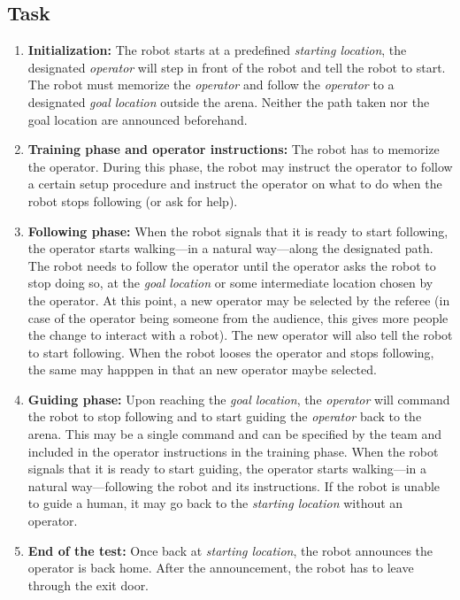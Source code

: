 \subsection{Task}

\begin{enumerate}
\item \textbf{Initialization:} The robot starts at a predefined \emph{starting location}, the designated \textit{operator} will step in front of the robot and tell the robot to start. 
  The robot must memorize the \textit{operator} and follow the \emph{operator} to a designated \emph{goal location} outside the arena. 
  Neither the path taken nor the goal location are announced beforehand.
\item \textbf{Training phase and operator instructions:} The robot has to memorize the operator. 
  During this phase, the robot may instruct the operator to follow a certain setup procedure and instruct the operator on what to do when the robot stops following (or ask for help).
\item \textbf{Following phase:} When the robot signals that it is ready to start following, the operator starts walking---in a natural way---along the designated path. 
  The robot needs to follow the operator until the operator asks the robot to stop doing so, at the \textit{goal location} or some intermediate location chosen by the operator.
  At this point, a new operator may be selected by the referee (in case of the operator being someone from the audience, this gives more people the change to interact with a robot). 
  The new operator will also tell the robot to start following.
  When the robot looses the operator and stops following, the same may happpen in that an new operator maybe selected. 
\item \textbf{Guiding phase:} Upon reaching the \textit{goal location}, the \textit{operator} will command the robot to stop following and to start guiding the \emph{operator} back to the arena.
  This may be a single command and can be specified by the team and included in the operator instructions in the training phase.
  When the robot signals that it is ready to start guiding, the operator starts walking---in a natural way---following the robot and its instructions.
  If the robot is unable to guide a human, it may go back to the \textit{starting location} without an operator. 
\item \textbf{End of the test:} Once back at \textit{starting location}, the robot announces the operator is back home. 
  After the announcement, the robot has to leave through the exit door.
\end{enumerate}

